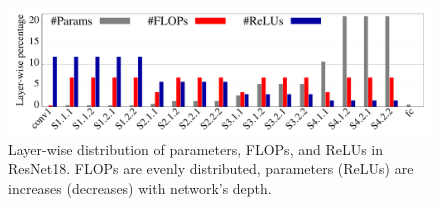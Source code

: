 
\begin{figure}[t]
\includegraphics[scale=0.19]{Figures/LayerWiseOps_R18}
\vspace{-2em}
\caption{
Layer-wise distribution of parameters, FLOPs, and ReLUs in ResNet18.
FLOPs are evenly distributed, parameters (ReLUs) are increases (decreases) with network's depth.} 
\label{fig:LayerWiseReluInDNNs}
\vspace{-1em}
\end{figure}